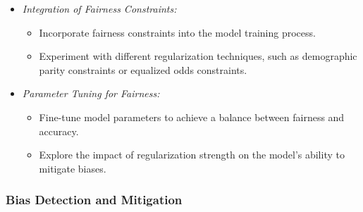 \documentclass[12pt,a4paper,openright,twoside]{book}
\begin{document}
\begin{itemize}

    \item \emph{Integration of Fairness Constraints:}

    \begin{itemize}

        \item Incorporate fairness constraints into the model training process.

        \item Experiment with different regularization techniques, such as demographic parity constraints or equalized odds constraints.

    \end{itemize}

    \item \emph{Parameter Tuning for Fairness:}

    \begin{itemize}

    \item Fine-tune model parameters to achieve a balance between fairness and accuracy.

    \item Explore the impact of regularization strength on the model's ability to mitigate biases.

    \end{itemize}

\end{itemize}

\subsubsection{Bias Detection and Mitigation}
\end{document}
